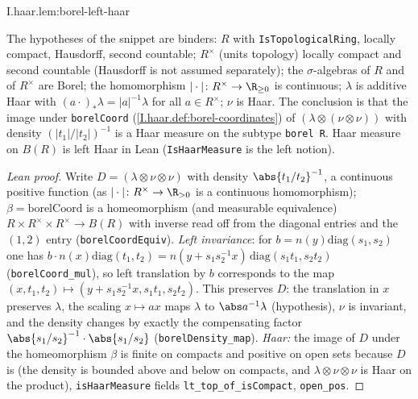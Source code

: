 \begin{tfformal}{I.haar.lem:borel-left-haar}
\begin{tffidelity}
The hypotheses of the snippet are binders: $R$ with \texttt{IsTopologicalRing}, locally compact, Hausdorff, second countable; $R^\times$ (units topology) locally compact and second countable (Hausdorff is not assumed separately); the $\sigma$-algebras of $R$ and of $R^\times$ are Borel; the homomorphism $|\cdot|\colon R^\times\to\R_{\ge0}$ is continuous; $\lambda$ is additive Haar with $(a\cdot)_*\lambda=|a|^{-1}\lambda$ for all $a\in R^\times$; $\nu$ is Haar. The conclusion is that the image under \texttt{borelCoord} (\cref{I.haar.def:borel-coordinates}) of $(\lambda\otimes(\nu\otimes\nu))$ with density $(|t_1|/|t_2|)^{-1}$ is a Haar measure on the subtype \texttt{borel R}. Haar measure on $B(R)$ is left Haar in Lean (\texttt{IsHaarMeasure} is the left notion).
\end{tffidelity}
\end{tfformal}
\begin{proof}[Lean proof]
Write $D=(\lambda\otimes\nu\otimes\nu)$ with density $\abs{t_1/t_2}^{-1}$, a continuous positive function (as $|\cdot|\colon R^\times\to\R_{>0}$ is a continuous homomorphism); $\beta=\mathrm{borelCoord}$ is a homeomorphism (and measurable equivalence) $R\times R^\times\times R^\times\to B(R)$ with inverse read off from the diagonal entries and the $(1,2)$ entry (\texttt{borelCoordEquiv}). \emph{Left invariance}: for $b=n(y)\mathrm{diag}(s_1,s_2)$ one has $b\cdot n(x)\mathrm{diag}(t_1,t_2)=n(y+s_1s_2^{-1}x)\,\mathrm{diag}(s_1t_1,s_2t_2)$ (\texttt{borelCoord\_mul}), so left translation by $b$ corresponds to the map $(x,t_1,t_2)\mapsto(y+s_1s_2^{-1}x,s_1t_1,s_2t_2)$. This preserves $D$: the translation in $x$ preserves $\lambda$, the scaling $x\mapsto ax$ maps $\lambda$ to $\abs a^{-1}\lambda$ (hypothesis), $\nu$ is invariant, and the density changes by exactly the compensating factor $\abs{s_1/s_2}^{-1}\cdot\abs{s_1/s_2}$ (\texttt{borelDensity\_map}). \emph{Haar:} the image of $D$ under the homeomorphism $\beta$ is finite on compacts and positive on open sets because $D$ is (the density is bounded above and below on compacts, and $\lambda\otimes\nu\otimes\nu$ is Haar on the product), \texttt{isHaarMeasure} fields \texttt{lt\_top\_of\_isCompact}, \texttt{open\_pos}.
\end{proof}

